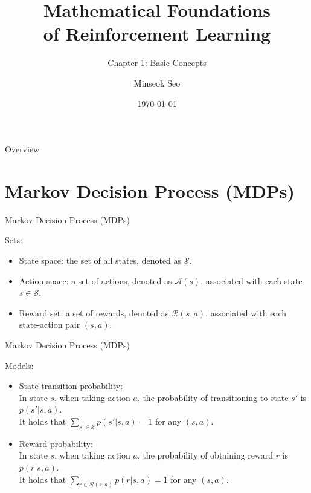 \documentclass[aspectratio=169,xcolor=dvipsnames]{beamer}
\title{Mathematical Foundations \\ of Reinforcement Learning}
\subtitle{Chapter 1: Basic Concepts}
\author{Minseok Seo}
\institute
{
    Artificial Intelligence Graduate School \\
    Gwangju Institute of Science and Technology (GIST) %
}
\date{\today} %
\begin{document}
\begin{frame}
    \titlepage
\end{frame}

\begin{frame}{Overview}
    \tableofcontents
\end{frame}

\section{Markov Decision Process (MDPs)}

\begin{frame}{Markov Decision Process (MDPs)}
    
Sets:
\begin{itemize}
	\item State space: the set of all states, denoted as $\mathcal{S}$.
	\item Action space: a set of actions, denoted as $\mathcal{A}(s)$, associated with each state $s \in \mathcal{S}$.
	\item Reward set: a set of rewards, denoted as $\mathcal{R}(s, a)$, associated with each state-action pair $(s, a)$.
\end{itemize}

\end{frame}


\begin{frame}{Markov Decision Process (MDPs)}

Models:
\begin{itemize}
	\item State transition probability: \\
	In state $s$, when taking action $a$, the probability of transitioning to state $s'$ is $p(s'|s, a)$. \\
	It holds that $\sum_{s' \in \mathcal{S}} p(s'|s, a) = 1$ for any $(s, a)$.
	\item Reward probability: \\
	In state $s$, when taking action $a$, the probability of obtaining reward $r$ is $p(r|s, a)$. \\
	It holds that $\sum_{r \in \mathcal{R}(s, a)} p(r|s, a) = 1$ for any $(s, a)$.
\end{itemize}

\end{frame}
\end{document}
